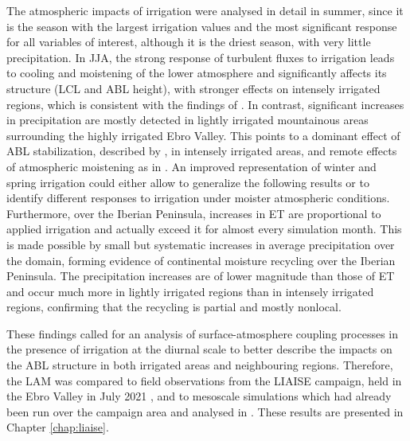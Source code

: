 The atmospheric impacts of irrigation were analysed in detail in summer, since it is the season with the largest irrigation values and the most significant response for all variables of interest, although it is the driest season, with very little precipitation. 
In JJA, the strong response of turbulent fluxes to irrigation leads to cooling and moistening of the lower atmosphere and significantly affects its structure (LCL and ABL height), with stronger effects on intensely irrigated regions, which is consistent with the findings of \citet{rappin_landatmosphere_2022}. In contrast, significant increases in precipitation are mostly detected in lightly irrigated mountainous areas surrounding the highly irrigated Ebro Valley. This points to a dominant effect of ABL stabilization, described by \citet{findell_atmospheric_2003-1, ek_influence_2004}, in intensely irrigated areas, and remote effects of atmospheric moistening as in \citet{deangelis_evidence_2010, lo_irrigation_2013, yang_impact_2017}. 
An improved representation of winter and spring irrigation could either allow to generalize the following results or to identify different responses to irrigation under moister atmospheric conditions.
Furthermore, over the Iberian Peninsula, increases in ET are proportional to applied irrigation and actually exceed it for almost every simulation month. This is made possible by small but systematic increases in average precipitation over the domain, forming evidence of continental moisture recycling over the Iberian Peninsula. The precipitation increases are of lower magnitude than those of ET and occur much more in lightly irrigated regions than in intensely irrigated regions, confirming that the recycling is partial and mostly nonlocal.

These findings called for an analysis of surface-atmosphere coupling processes in the presence of irrigation at the diurnal scale to better describe the impacts on the ABL structure in both irrigated areas and neighbouring regions.
Therefore, the LAM was compared to field observations from the LIAISE campaign, held in the Ebro Valley in July 2021 \citep{boone_land_2025}, and to mesoscale simulations which had already been run over the campaign area and analysed in \citet{lunel_irrigation_2024,lunel_marinada_2024}. These results are presented in Chapter \ref{chap:liaise}.


